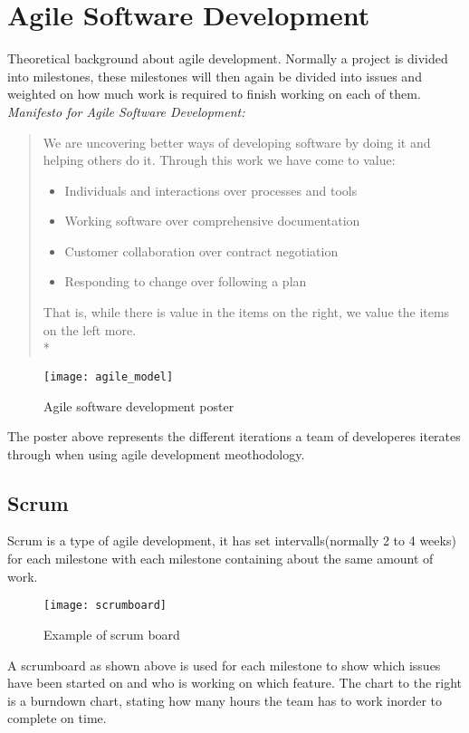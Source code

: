 \section{Agile Software Development}
Theoretical background about agile development. Normally a project is divided into milestones, these milestones will then again be divided into issues and weighted on how much work is required to finish working on each of them.\linebreak
\emph{Manifesto for Agile Software Development:}\cite{agilemanifesto}
\begin{quotation}
We are uncovering better ways of developing software by doing it and helping others do it. Through this work we have come to value:
\begin{itemize}
\item Individuals and interactions over processes and tools
\item Working software over comprehensive documentation
\item Customer collaboration over contract negotiation
\item Responding to change over following a plan
\end{itemize}
That is, while there is value in the items on
the right, we value the items on the left more.\\*
\end{quotation}

\begin{figure}[!htpb]
\centering
	\texttt{[image: agile\_model]}
\caption{Agile software development poster}
\label{logo}
\end{figure}

The poster above represents the different iterations a team of developeres iterates through when using agile development meothodology.

\subsection{Scrum}
Scrum is a type of agile development, it has set intervalls(normally 2 to 4 weeks) for each milestone with each milestone containing about the same amount of work.

\begin{figure}[!htpb]
\centering
	\texttt{[image: scrumboard]}
\caption{Example of scrum board}
\label{logo}
\end{figure}

A scrumboard as shown above is used for each milestone to show which issues have been started on and who is working on which feature. The chart to the right is a burndown chart, stating how many hours the team has to work inorder to complete on time.